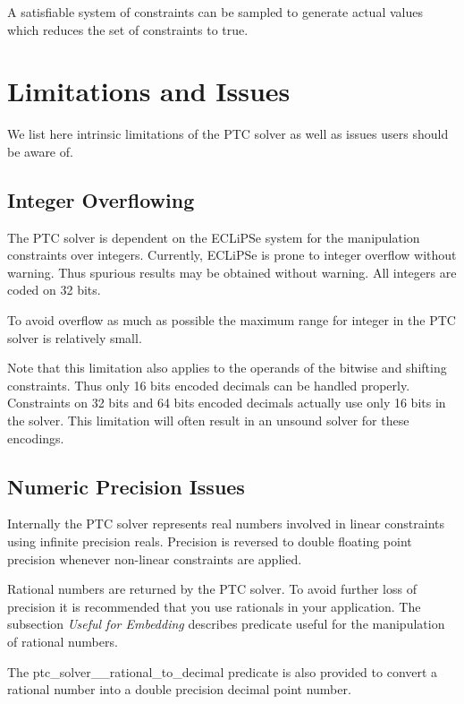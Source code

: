 \documentclass{article}
\begin{document}
A satisfiable system of constraints can be sampled to generate actual values
which reduces the set of constraints to true.

\section{Limitations and Issues}
We list here intrinsic limitations of the PTC solver as well as issues users
should be aware of.

\subsection{Integer Overflowing}

The PTC solver is dependent on the ECLiPSe system for the manipulation
constraints over integers. Currently, ECLiPSe is
prone to integer overflow without warning. Thus spurious results may be obtained
without warning.
All integers are coded on 32 bits.

To avoid overflow as much as possible the maximum range for integer in the PTC
solver is relatively small.

Note that this limitation also applies to the operands of the bitwise and
shifting constraints. Thus only 16 bits encoded decimals can be
handled properly. Constraints on 32 bits and 64 bits encoded decimals actually
use only 16 bits in the solver. This limitation will often
result in an unsound solver for these encodings.

\subsection{Numeric Precision Issues}

Internally the PTC solver represents real numbers involved in linear constraints
using infinite precision reals. Precision is reversed to
double floating point precision whenever non-linear constraints are applied.

Rational numbers are returned by the PTC solver. To avoid further loss of
precision it is recommended that you use rationals in your application.
The subsection \textit{Useful for Embedding} describes predicate useful for the
manipulation of rational numbers.

The ptc\_solver\_\_rational\_to\_decimal predicate is also provided to convert a
rational number into a double precision decimal point
number.

\end{document}
